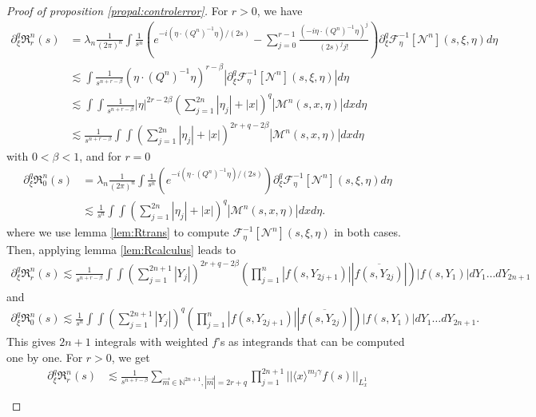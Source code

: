 \documentclass[a4paper, 15pt]{article}
\numberwithin{equation}{section}
\begin{document}
\begin{proof}[Proof of proposition \ref{propal:controlerror}]
For $r>0$, we have
\begin{align*}
    \partial^q_\xi \mathfrak{R}^n_r(s)&=\lambda_n\frac{1}{(2\pi)^n}\int\frac{1}{s^n}(e^{-i(\eta\cdot  (Q^n)^{-1}\eta)/(2s)}-\sum^{r-1}_{j=0}\frac{(-i\eta\cdot (Q^n)^{-1}\eta)^j}{(2s)^{j}j!}) \partial^q_\xi\mathcal{F}^{-1}_{\eta}[\mathcal{N}^n](s,\xi,\eta)d\eta\\
    &\lesssim \int\frac{1}{s^{n+r-\beta}}(\eta\cdot (Q^n)^{-1}\eta)^{r-\beta} |\partial^q_\xi\mathcal{F}^{-1}_{\eta}[\mathcal{N}^n](s,\xi,\eta)|d\eta\\
    &\lesssim\int\int\frac{1}{s^{n+r-\beta}}|\eta|^{2r-2\beta} (\sum_{j=1}^{2n}|\eta_j|+|x|)^{q}|\mathcal{M}^{n}(s,x,\eta)|dxd\eta\\
    &\lesssim\frac{1}{s^{n+r-\beta}}\int\int(\sum_{j=1}^{2n}|\eta_j|+|x|)^{2r+q-2\beta} |\mathcal{M}^{n}(s,x,\eta)|dxd\eta
\end{align*}
with $0<\beta<1$, and for $r=0$
\begin{align*}
    \partial^q_\xi \mathfrak{R}^n_0(s)&=\lambda_n\frac{1}{(2\pi)^n}\int\frac{1}{s^n}(e^{-i(\eta\cdot  (Q^n)^{-1}\eta)/(2s)}) \partial^q_\xi\mathcal{F}^{-1}_{\eta}[\mathcal{N}^n](s,\xi,\eta)d\eta\\
    &\lesssim \frac{1}{s^{n}} \int\int(\sum_{j=1}^{2n}|\eta_j|+|x|)^{q}|\mathcal{M}^{n}(s,x,\eta)|dxd\eta.
\end{align*} 
where we use lemma \ref{lem:Rtrans} to compute $\mathcal{F}^{-1}_{\eta}[\mathcal{N}^n](s,\xi,\eta)$ in both cases. Then, applying lemma \ref{lem:Rcalculus} leads to
\begin{align*}
    \partial^q_\xi \mathfrak{R}^n_r(s)\lesssim\frac{1}{s^{n+r-\beta}}\int\int(\sum_{j=1}^{2n+1}|Y_{j}|)^{2r+q-2\beta}\left(\prod^{n}_{j=1}|f(s,Y_{2j+1})||\overline{f(s,Y_{2j})}|\right)|f(s,Y_1)|dY_1\dots dY_{2n+1}
\end{align*}
and 
\begin{align*}
    \partial^q_\xi \mathfrak{R}^n_0(s)\lesssim\frac{1}{s^{n}} \int\int(\sum_{j=1}^{2n+1}|Y_{j}|)^{q}\left(\prod^{n}_{j=1}|f(s,Y_{2j+1})||\overline{f(s,Y_{2j})}|\right)|f(s,Y_1)|dY_1\dots dY_{2n+1}.
\end{align*}
This gives $2n+1$ integrals with weighted $f$'s as integrands that can be computed one by one. For $r>0$, we get 
\begin{align*}
    \partial^q_\xi \mathfrak{R}^n_r(s)
    &\lesssim \frac{1}{s^{n+r-\beta}}\sum_{\overrightarrow{m}\in\mathbb{N}^{2n+1}, |\overrightarrow{m}|=2r+q}\prod^{2n+1}_{j=1}||\langle x\rangle^{m_j\gamma} f(s)||_{L^1_x} \\

\end{align*}
\end{proof}
\end{document}
